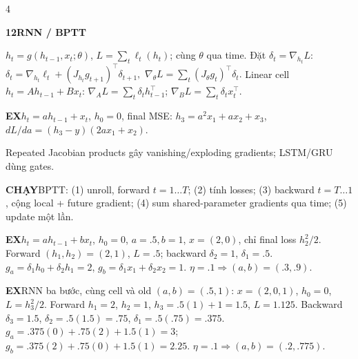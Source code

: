 \documentclass[a4paper]{article}
\newcommand{\topic}[2]{\par\addvspace{.8pt}%
  \begingroup\setlength{\fboxsep}{0.5pt}%
  \noindent\colorbox{structure}{\parbox{\dimexpr\linewidth-2\fboxsep\relax}{%
    \color{white}\fontsize{6.5}{7.1}\selectfont\bfseries #1\enspace #2}}%
  \endgroup\par\nobreak\vspace{.3pt}\nobreak}
\newcommand{\run}[1]{\key{CHẠY}#1}
\newcommand{\key}[1]{\par\textcolor{structure}{\textbf{#1}}\enspace}
\newcommand{\note}[4]{\par\begingroup\setlength{\fboxsep}{0.15pt}%
  \noindent\colorbox{#1}{\parbox{\dimexpr\linewidth-2\fboxsep\relax}{%
    \RaggedRight\textcolor{#2}{\textbf{#3}}\enspace #4}}%
  \endgroup\par}
\newcommand{\ex}[1]{\note{examplebg}{example}{EX}{#1}}
\begin{document}
\begin{multicols*}{4}
\topic{12}{RNN / BPTT}
$h_t=g(h_{t-1},x_t;\theta)$, $L=\sum_t\ell_t(h_t)$; cùng $\theta$ qua time. Đặt $\delta_t=\nabla_{h_t}L$:
$\delta_t=\nabla_{h_t}\ell_t+(J_{h_t}g_{t+1})^\top\delta_{t+1},$
$\nabla_\theta L=\sum_t(J_\theta g_t)^\top\delta_t.$
Linear cell $h_t=Ah_{t-1}+Bx_t$:
$\nabla_AL=\sum_t\delta_t h_{t-1}^\top$;
$\nabla_BL=\sum_t\delta_t x_t^\top$.
\ex{$h_t=ah_{t-1}+x_t$, $h_0=0$, final MSE: $h_3=a^2x_1+ax_2+x_3$, $dL/da=(h_3-y)(2ax_1+x_2)$.}
Repeated Jacobian products gây vanishing/exploding gradients; LSTM/GRU dùng gates.
\run{BPTT: (1) unroll, forward $t=1\ldots T$; (2) tính losses; (3) backward $t=T\ldots1$, cộng local + future gradient; (4) sum shared-parameter gradients qua time; (5) update một lần.}
\ex{$h_t=ah_{t-1}+bx_t$, $h_0=0$, $a=.5,b=1$, $x=(2,0)$, chỉ final loss $h_2^2/2$. Forward $(h_1,h_2)=(2,1)$, $L=.5$; backward $\delta_2=1$, $\delta_1=.5$. $g_a=\delta_1h_0+\delta_2h_1=2$, $g_b=\delta_1x_1+\delta_2x_2=1$. $\eta=.1\Rightarrow(a,b)=(.3,.9)$.}
\ex{RNN ba bước, cùng cell và old $(a,b)=(.5,1)$: $x=(2,0,1)$, $h_0=0$, $L=h_3^2/2$. Forward $h_1=2$, $h_2=1$, $h_3=.5(1)+1=1.5$, $L=1.125$. Backward $\delta_3=1.5$, $\delta_2=.5(1.5)=.75$, $\delta_1=.5(.75)=.375$. $g_a=.375(0)+.75(2)+1.5(1)=3$; $g_b=.375(2)+.75(0)+1.5(1)=2.25$. $\eta=.1\Rightarrow(a,b)=(.2,.775)$.}


\end{multicols*}
\end{document}
